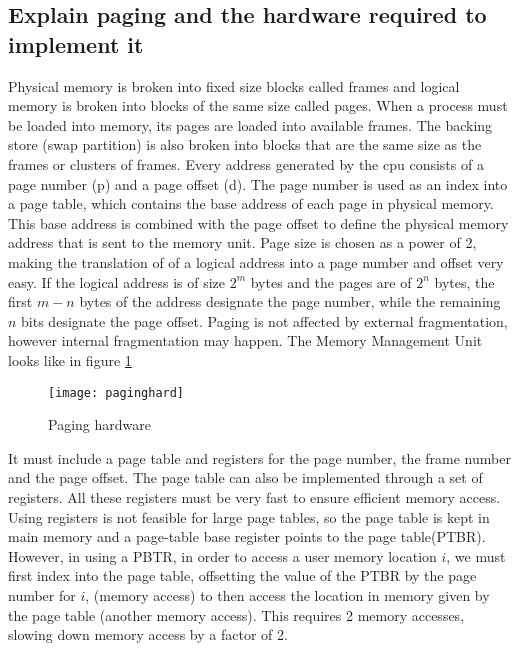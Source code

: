 \documentclass{article}
\begin{document}
\subsection{Explain paging and the hardware required to implement it}
Physical memory is broken into fixed size blocks called frames and logical memory is broken into blocks of the same size called pages. When a process must be loaded into memory, its pages are loaded into available frames. The backing store (swap partition) is also broken into blocks that are the same size as the frames or clusters of frames. Every address generated by the cpu consists of a page number (p) and a page offset (d). The page number is used as an index into a page table, which contains the base address of each page in physical memory. This base address is combined with the page offset to define the physical memory address that is sent to the memory unit. Page size is chosen as a power of 2, making the translation of of a logical address into a page number and offset very easy. If the logical address is of size $2^m$ bytes and the pages are of $2^n$ bytes, the first $m-n$ bytes of the address designate the page number, while the remaining $n$ bits designate the page offset. Paging is not affected by external fragmentation, however internal fragmentation may happen. The Memory Management Unit looks like in figure \ref{paginghard}
\begin{figure}[ht]
    \centering
    \texttt{[image: paginghard]}
    \caption{Paging hardware}
    \label{paginghard}
\end{figure}

It must include a page table and registers for the page number, the frame number and the page offset. The page table can also be implemented through a set of registers. All these registers must be very fast to ensure efficient memory access. Using registers is not feasible for large page tables, so the page table is kept in main memory and a page-table base register points to the page table(PTBR). However, in using a PBTR, in order to access a user memory location $i$, we must first index into the page table, offsetting the value of the PTBR by the page number for $i$, (memory access) to then access the location in memory given by the page table (another memory access). This requires 2 memory accesses, slowing down memory access by a factor of 2. 
\end{document}
